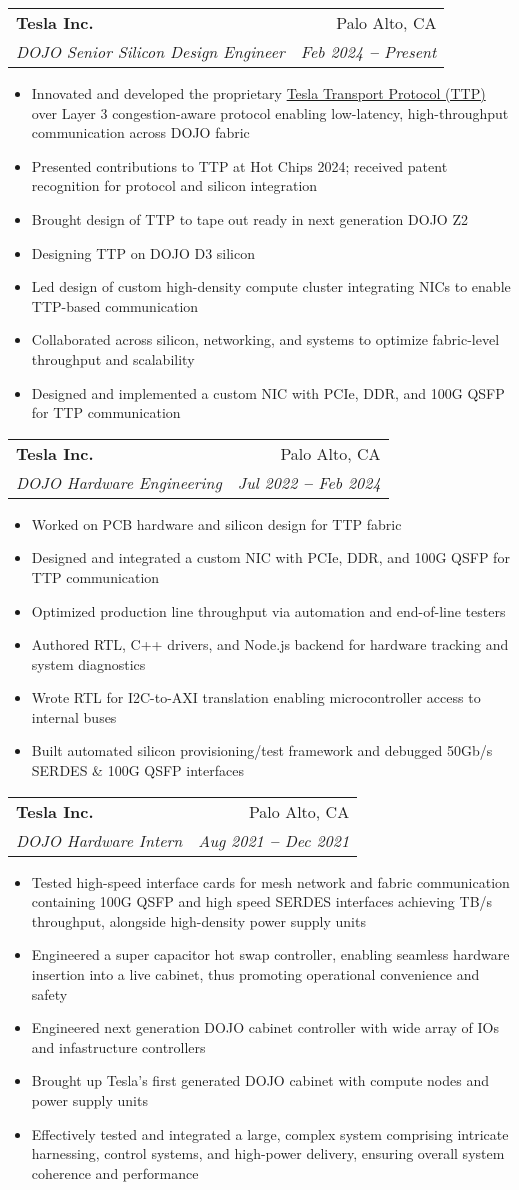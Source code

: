 \documentclass[letterpaper,11pt]{article}
\makeatletter
\newcommand{\resumeItem}[1]{
  \item\small{
    {#1 \vspace{-2pt}}
  }
}
\newcommand{\resumeSubheading}[4]{
  \vspace{-2pt}\item
    \begin{tabular*}{0.97\textwidth}[t]{l@{\extracolsep{\fill}}r}
      \textbf{#1} & #2 \\
      \textit{\small#3} & \textit{\small #4} \\
    \end{tabular*}\vspace{-7pt}
}
\newcommand{\resumeItemListStart}{\begin{itemize}}
\newcommand{\resumeItemListEnd}{\end{itemize}\vspace{-5pt}}
\makeatother
\begin{document}
  \resumeSubheading
    {Tesla Inc.}{Palo Alto, CA}
    {DOJO Senior Silicon Design Engineer}{Feb 2024 \textbf{--} Present}
    \resumeItemListStart
      \resumeItem{Innovated and developed the proprietary \href{https://patentimages.storage.googleapis.com/be/ad/28/d9a3cf28a032ae/WO2024039793A1.pdf}{Tesla Transport Protocol (TTP)} over Layer 3 congestion-aware protocol enabling low-latency, high-throughput communication across DOJO fabric}
      \resumeItem{Presented contributions to TTP at Hot Chips 2024; received patent recognition for protocol and silicon integration}
      \resumeItem{Brought design of TTP to tape out ready in next generation DOJO Z2}
      \resumeItem{Designing TTP on DOJO D3 silicon}
      \resumeItem{Led design of custom high-density compute cluster integrating NICs to enable TTP-based communication}
      \resumeItem{Collaborated across silicon, networking, and systems to optimize fabric-level throughput and scalability}
      \resumeItem{Designed and implemented a custom NIC with PCIe, DDR, and 100G QSFP for TTP communication}
    \resumeItemListEnd

  \resumeSubheading
    {Tesla Inc.}{Palo Alto, CA}
    {DOJO Hardware Engineering}{Jul 2022 \textbf{--} Feb 2024}
    \resumeItemListStart
      \resumeItem{Worked on PCB hardware and silicon design for TTP fabric}
      \resumeItem{Designed and integrated a custom NIC with PCIe, DDR, and 100G QSFP for TTP communication}
      \resumeItem{Optimized production line throughput via automation and end-of-line testers}
      \resumeItem{Authored RTL, C++ drivers, and Node.js backend for hardware tracking and system diagnostics}
      \resumeItem{Wrote RTL for I2C-to-AXI translation enabling microcontroller access to internal buses}
      \resumeItem{Built automated silicon provisioning/test framework and debugged 50Gb/s SERDES \& 100G QSFP interfaces}
    \resumeItemListEnd

  \resumeSubheading
    {Tesla Inc.}{Palo Alto, CA}
    {DOJO Hardware Intern}{Aug 2021 \textbf{--} Dec 2021}
    \resumeItemListStart
      \resumeItem{Tested high-speed interface cards for mesh network and fabric communication containing 100G QSFP and high speed SERDES interfaces achieving TB/s throughput, alongside high-density power supply units}
      \resumeItem{Engineered a super capacitor hot swap controller, enabling seamless hardware insertion into a live cabinet, thus promoting operational convenience and safety}
      \resumeItem{Engineered next generation DOJO cabinet controller with wide array of IOs and infastructure controllers}
      \resumeItem{Brought up Tesla's first generated DOJO cabinet with compute nodes and power supply units}
      \resumeItem{Effectively tested and integrated a large, complex system comprising intricate harnessing, control systems, and high-power delivery, ensuring overall system coherence and performance}
    \resumeItemListEnd
\end{document}
